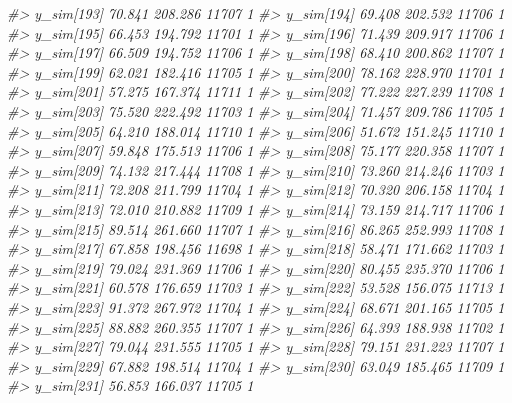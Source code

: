\documentclass[
  10pt,
  italian,
  a4paper,
  extrafontsizes,onecolumn,openright
  ]{memoir}
\newenvironment{Shaded}{\begin{snugshade}}{\end{snugshade}}
\newcommand{\CommentTok}[1]{\textcolor[rgb]{0.56,0.35,0.01}{\textit{#1}}}
\begin{document}
\begin{Shaded}
\begin{Highlighting}[]
\CommentTok{\#\textgreater{} y\_sim[193] 70.841 208.286 11707    1}
\CommentTok{\#\textgreater{} y\_sim[194] 69.408 202.532 11706    1}
\CommentTok{\#\textgreater{} y\_sim[195] 66.453 194.792 11701    1}
\CommentTok{\#\textgreater{} y\_sim[196] 71.439 209.917 11706    1}
\CommentTok{\#\textgreater{} y\_sim[197] 66.509 194.752 11706    1}
\CommentTok{\#\textgreater{} y\_sim[198] 68.410 200.862 11707    1}
\CommentTok{\#\textgreater{} y\_sim[199] 62.021 182.416 11705    1}
\CommentTok{\#\textgreater{} y\_sim[200] 78.162 228.970 11701    1}
\CommentTok{\#\textgreater{} y\_sim[201] 57.275 167.374 11711    1}
\CommentTok{\#\textgreater{} y\_sim[202] 77.222 227.239 11708    1}
\CommentTok{\#\textgreater{} y\_sim[203] 75.520 222.492 11703    1}
\CommentTok{\#\textgreater{} y\_sim[204] 71.457 209.786 11705    1}
\CommentTok{\#\textgreater{} y\_sim[205] 64.210 188.014 11710    1}
\CommentTok{\#\textgreater{} y\_sim[206] 51.672 151.245 11710    1}
\CommentTok{\#\textgreater{} y\_sim[207] 59.848 175.513 11706    1}
\CommentTok{\#\textgreater{} y\_sim[208] 75.177 220.358 11707    1}
\CommentTok{\#\textgreater{} y\_sim[209] 74.132 217.444 11708    1}
\CommentTok{\#\textgreater{} y\_sim[210] 73.260 214.246 11703    1}
\CommentTok{\#\textgreater{} y\_sim[211] 72.208 211.799 11704    1}
\CommentTok{\#\textgreater{} y\_sim[212] 70.320 206.158 11704    1}
\CommentTok{\#\textgreater{} y\_sim[213] 72.010 210.882 11709    1}
\CommentTok{\#\textgreater{} y\_sim[214] 73.159 214.717 11706    1}
\CommentTok{\#\textgreater{} y\_sim[215] 89.514 261.660 11707    1}
\CommentTok{\#\textgreater{} y\_sim[216] 86.265 252.993 11708    1}
\CommentTok{\#\textgreater{} y\_sim[217] 67.858 198.456 11698    1}
\CommentTok{\#\textgreater{} y\_sim[218] 58.471 171.662 11703    1}
\CommentTok{\#\textgreater{} y\_sim[219] 79.024 231.369 11706    1}
\CommentTok{\#\textgreater{} y\_sim[220] 80.455 235.370 11706    1}
\CommentTok{\#\textgreater{} y\_sim[221] 60.578 176.659 11703    1}
\CommentTok{\#\textgreater{} y\_sim[222] 53.528 156.075 11713    1}
\CommentTok{\#\textgreater{} y\_sim[223] 91.372 267.972 11704    1}
\CommentTok{\#\textgreater{} y\_sim[224] 68.671 201.165 11705    1}
\CommentTok{\#\textgreater{} y\_sim[225] 88.882 260.355 11707    1}
\CommentTok{\#\textgreater{} y\_sim[226] 64.393 188.938 11702    1}
\CommentTok{\#\textgreater{} y\_sim[227] 79.044 231.555 11705    1}
\CommentTok{\#\textgreater{} y\_sim[228] 79.151 231.223 11707    1}
\CommentTok{\#\textgreater{} y\_sim[229] 67.882 198.514 11704    1}
\CommentTok{\#\textgreater{} y\_sim[230] 63.049 185.465 11709    1}
\CommentTok{\#\textgreater{} y\_sim[231] 56.853 166.037 11705    1}

\end{Highlighting}
\end{Shaded}
\end{document}
